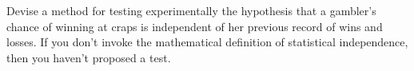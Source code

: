 Devise a method for testing experimentally the hypothesis
that a gambler's chance of winning at craps is independent
of her previous record of wins and losses. If you don't
invoke the mathematical definition of statistical independence, then you haven't
proposed a test.
